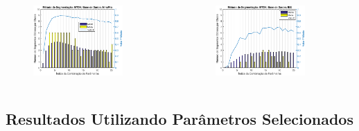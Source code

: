 \documentclass{beamer}
\begin{document}
\begin{frame}
\begin{columns}[c]
			\begin{figure}
				\begin{center}
					\includegraphics[width=0.8\textwidth]{./img/mtd4_nina.eps}
				\end{center}
			\end{figure}
			\begin{figure}
				\begin{center}
					\includegraphics[width=0.8\textwidth]{./img/mtd4_iee.eps}
				\end{center}
			\end{figure}
			
		\end{columns}
	\end{frame}
	
	\subsection[Resultados Utilizando Parâmetros Selecionados]{Resultados Utilizando Parâmetros Selecionados}
	
\end{document}
